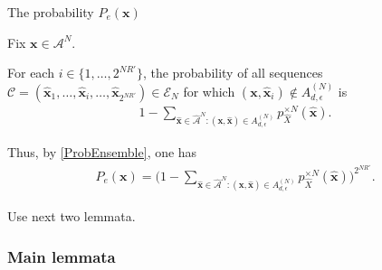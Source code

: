 \begin{frame}{The probability $P_e(\mathbf{x})$}
\bit
\item Fix $\mathbf{x}\in\mathcal{A}^N$. 
\item For each $i\in\{1,\dots,2^{NR'}\}$, the probability of all sequences $\mathcal{C}=({\hat{\mathbf{x}}}_1,\dots,{\hat{\mathbf{x}}}_i,\dots,{\hat{\mathbf{x}}}_{2^{NR'}})\in\mathcal{E}_N$ for which $(\mathbf{x},{\hat{\mathbf{x}}}_i)\notin A_{d, \epsilon}^{(N)}$
is 
\begin{align*}
1-\sum_{\hat{\mathbf{x}}\in\hat{\mathcal{A}}^N\colon (\mathbf{x}, \hat{\mathbf{x}})\in A_{d, \epsilon}^{(N)}}p^{\times N}_{\hat{X}}(\hat{\mathbf{x}}).
\end{align*}
\item Thus, by \eqref{ProbEnsemble}, one has 
\begin{align}\label{FormulaPe}
P_e(\mathbf{x})=\bigl(1-\sum_{\hat{\mathbf{x}}\in\hat{\mathcal{A}}^N\colon (\mathbf{x}, \hat{\mathbf{x}})\in A_{d, \epsilon}^{(N)}}p^{\times N}_{\hat{X}}(\hat{\mathbf{x}})\bigr)^{2^{NR'}}.
\end{align}
\item[\iarrow] 
\item[\iarrow] Use next two lemmata. 
\eit 
\end{frame}

\subsubsection{Main lemmata}


